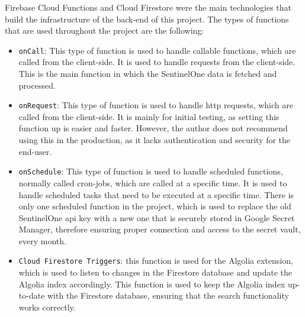 \begin{multicols}{2}

      Firebase Cloud Functions and Cloud Firestore were the main technologies that build the infrastructure of the back-end of this project.
      The types of functions that are used throughout the project are the following:
      \begin{itemize}
            \item \texttt{onCall}: This type of function is used to handle callable functions, which are called from the client-side. It is used
                  to handle requests from the client-side. This is the main function in which the SentinelOne data is fetched and processed.
            \item \texttt{onRequest}: This type of function is used to handle \acrshort{http} requests, which are called from the client-side.
                  It is mainly for initial testing, as setting this function up is easier and faster. However, the author does not recommend
                  using this in the production, as it lacks authentication and security for the end-user.
            \item \texttt{onSchedule}: This type of function is used to handle scheduled functions, normally called cron-jobs, which are called
                  at a specific time. It is used to handle scheduled tasks that need to be executed at a specific time. There is only one
                  scheduled function in the project, which is used to replace the old SentinelOne \acrshort{api} key with a new one that is
                  securely stored in Google Secret Manager, therefore ensuring proper connection and access to the secret vault, every month.
            \item \texttt{Cloud Firestore Triggers}: this function is used for the Algolia extension, which is used to listen to changes in the
                  Firestore database and update the Algolia index accordingly. This function is used to keep the Algolia index up-to-date with
                  the Firestore database, ensuring that the search functionality works correctly.
      \end{itemize}


\end{multicols}
